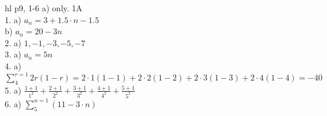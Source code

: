 hl p9, 1-6 a) only. 1A\\
1. a) $a_n=3+1.5\cdot n-1.5$\\
b) $a_n=20-3n$\\
2. a) $1, -1, -3, -5, -7$\\
3. a) $a_n=5n$\\
4. a) $\sum_{4}^{r=1}2r(1-r)=2\cdot 1(1-1)+2\cdot 2(1-2)+2\cdot 3(1-3)+2\cdot 4(1-4)=-40$\\
5. a) $\frac{1+1}{1^2}+\frac{2+1}{2^2}+\frac{3+1}{3^2}+\frac{4+1}{4^2}+\frac{5+1}{5^2}$\\
6. a) $\sum_{5}^{n=1}(11-3\cdot n)$\\

